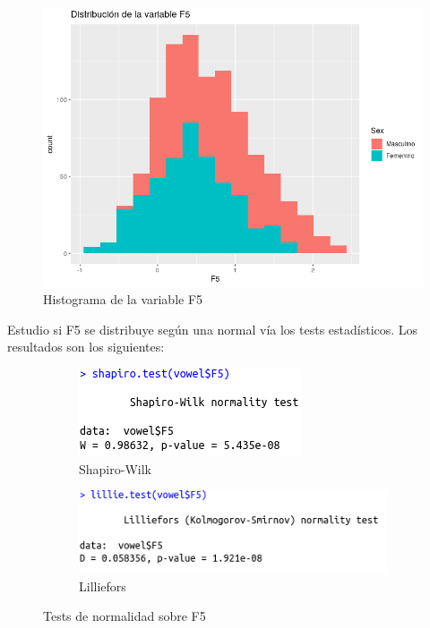 \begin{figure}[H] %
	\centering
	\includegraphics[scale=0.6]{dist-F5.png}  %
	\caption{Histograma de la variable F5} 
	\label{fig:hist-F5}
\end{figure}

Estudio si F5 se distribuye según una normal vía los tests estadísticos. Los resultados son los siguientes:

\begin{figure}[H]
	\centering
	\begin{subfigure}{.5\textwidth}
		\centering
		\includegraphics[width=.7\linewidth]{sw-F5.png}
		\caption{Shapiro-Wilk}
		\label{fig:sw-F5}
	\end{subfigure}%
	\begin{subfigure}{.5\textwidth}
		\centering
		\includegraphics[width=.8\linewidth]{l-F5.png}
		\caption{Lilliefors}
		\label{fig:l-F5}
	\end{subfigure}
	\caption{Tests de normalidad sobre F5}
	\label{fig:normF5}
\end{figure}

